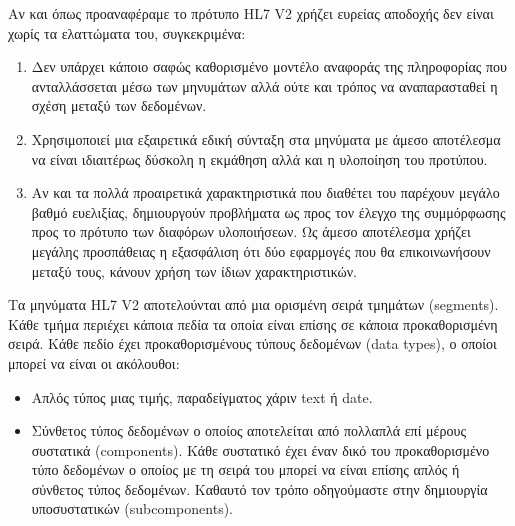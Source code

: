 		Αν και όπως προαναφέραμε το πρότυπο HL7 V2 χρήζει ευρείας αποδοχής δεν είναι χωρίς τα ελαττώματα του, συγκεκριμένα\cite{bourquard2015standards}:
		\begin{enumerate}
			\item Δεν υπάρχει κάποιο σαφώς καθορισμένο μοντέλο αναφοράς της πληροφορίας που ανταλλάσσεται μέσω των μηνυμάτων αλλά ούτε και τρόπος να αναπαρασταθεί η σχέση μεταξύ των δεδομένων.
			\item Χρησιμοποιεί μια εξαιρετικά εδική σύνταξη στα μηνύματα με άμεσο αποτέλεσμα να είναι ιδιαιτέρως δύσκολη η εκμάθηση αλλά και η υλοποίηση του προτύπου.
			\item Αν και τα πολλά προαιρετικά χαρακτηριστικά που διαθέτει του παρέχουν μεγάλο βαθμό ευελιξίας, δημιουργούν προβλήματα ως προς τον έλεγχο της συμμόρφωσης προς το πρότυπο των διαφόρων υλοποιήσεων. Ως άμεσο αποτέλεσμα χρήζει μεγάλης προσπάθειας η εξασφάλιση ότι δύο εφαρμογές που θα επικοινωνήσουν μεταξύ τους, κάνουν χρήση των ίδιων χαρακτηριστικών.
		\end{enumerate}
		
		Τα μηνύματα HL7 V2 αποτελούνται από μια ορισμένη σειρά τμημάτων (segments). Κάθε τμήμα περιέχει κάποια πεδία τα οποία είναι επίσης σε κάποια προκαθορισμένη σειρά. Κάθε πεδίο έχει προκαθορισμένους τύπους δεδομένων (data types), ο οποίοι μπορεί να είναι οι ακόλουθοι\cite{dolin2001hl7}:
		\begin{itemize}
			\item Απλός τύπος μιας τιμής, παραδείγματος χάριν text ή date.
			\item Σύνθετος τύπος δεδομένων ο οποίος αποτελείται από πολλαπλά επί μέρους συστατικά (components). Κάθε συστατικό έχει έναν δικό του προκαθορισμένο τύπο δεδομένων ο οποίος με τη σειρά του μπορεί να είναι επίσης απλός ή σύνθετος τύπος δεδομένων. Καθαυτό τον τρόπο οδηγούμαστε στην δημιουργία υποσυστατικών (subcomponents).
		\end{itemize}
		
